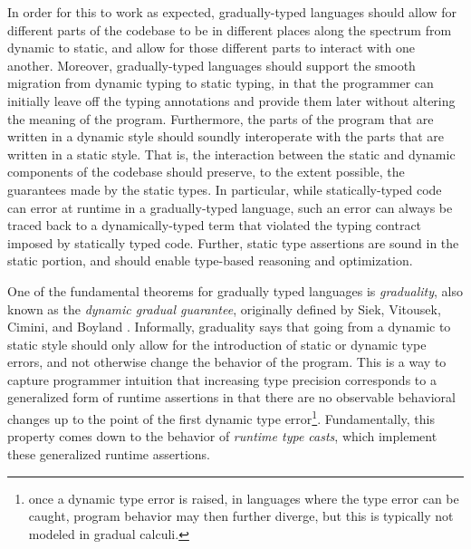In order for this to work as expected, gradually-typed languages should allow for
different parts of the codebase to be in different places along the spectrum from
dynamic to static, and allow for those different parts to interact with one another.
Moreover, gradually-typed languages should support the smooth migration from
dynamic typing to static typing, in that the programmer can initially leave off the
typing annotations and provide them later without altering the meaning of the program.
Furthermore, the parts of the program that are written in a dynamic
style should soundly interoperate with the parts that are written in a
static style.  That is, the interaction between the static and dynamic
components of the codebase should preserve, to the extent possible,
the guarantees made by the static types.  In particular, while
statically-typed code can error at runtime in a gradually-typed
language, such an error can always be traced back to a
dynamically-typed term that violated the typing contract imposed by
statically typed code. Further, static type assertions are sound in
the static portion, and should enable type-based reasoning and
optimization.


One of the fundamental theorems for gradually typed languages is
\emph{graduality}, also known as the \emph{dynamic gradual guarantee},
originally defined by Siek, Vitousek, Cimini, and Boyland
\cite{siek_et_al:LIPIcs:2015:5031, new-ahmed2018}.
%
Informally, graduality says that going from a dynamic to static style should
only allow for the introduction of static or dynamic type errors, and not
otherwise change the behavior of the program.
%
This is a way to capture programmer intuition that increasing type
precision corresponds to a generalized form of runtime assertions in
that there are no observable behavioral changes up to the point of the
first dynamic type error\footnote{once a dynamic type error is raised,
in languages where the type error can be caught, program behavior may
then further diverge, but this is typically not modeled in gradual
calculi.}.
%
Fundamentally, this property comes down to the behavior of
\emph{runtime type casts}, which implement these generalized runtime
assertions.

